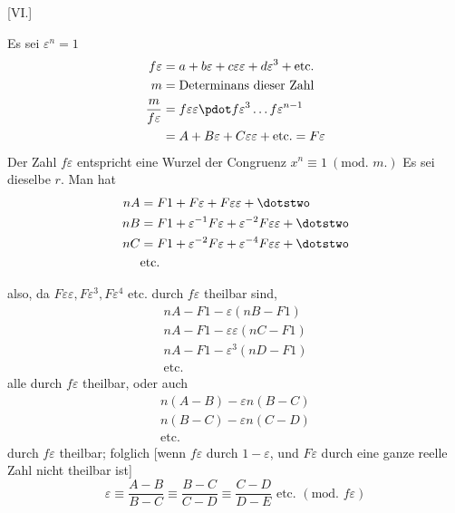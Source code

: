 %
\begin{center}[VI.]\end{center}
Es sei $\varepsilon^n=1$
\[
\begin{aligned}
f\varepsilon&=a+b\varepsilon+c\varepsilon\varepsilon+d\varepsilon^3+\text{etc.}\\
m&=\text{Determinans dieser Zahl}\\
\frac{m}{f\varepsilon}&=f\varepsilon\varepsilon\pdot f\varepsilon^3\ldots f\varepsilon^{n-1}\\
&=A+B\varepsilon+C\varepsilon\varepsilon+\text{etc.}=F\varepsilon
\end{aligned}
\]
Der Zahl $f\varepsilon$ entspricht eine Wurzel der Congruenz $x^n\equiv1\ (\text{mod. }m.)$ Es sei dieselbe $r$. Man hat
\[
\begin{aligned}
nA&=F1+F\varepsilon+F\varepsilon\varepsilon+\dotstwo\\
nB&=F1+\varepsilon^{-1}F\varepsilon+\varepsilon^{-2}F\varepsilon\varepsilon+\dotstwo\\
nC&=F1+\varepsilon^{-2}F\varepsilon+\varepsilon^{-4}F\varepsilon\varepsilon+\dotstwo\\
&\text{etc.}
\end{aligned}
\]

also, da $F\varepsilon\varepsilon,F\varepsilon^3,F\varepsilon^4$ etc. durch $f\varepsilon$ theilbar sind,
\[
\begin{gathered}
nA-F1-\varepsilon(nB-F1)\\
nA-F1-\varepsilon\varepsilon(nC-F1)\\
nA-F1-\varepsilon^3(nD-F1)\\
\text{etc.}
\end{gathered}
\]
alle durch $f\varepsilon$ theilbar, oder auch
\[
\begin{gathered}
n(A-B)-\varepsilon n(B-C)\\
n(B-C)-\varepsilon n(C-D)\\
\text{etc.}
\end{gathered}
\]
durch $f\varepsilon$ theilbar; folglich [wenn $f\varepsilon$ durch $1-\varepsilon$, und $F\varepsilon$ durch eine ganze reelle Zahl nicht theilbar ist]
\[
\varepsilon\equiv\frac{A-B}{B-C}\equiv\frac{B-C}{C-D}\equiv\frac{C-D}{D-E}\text{ etc. }(\text{mod. }f\varepsilon)
\]

